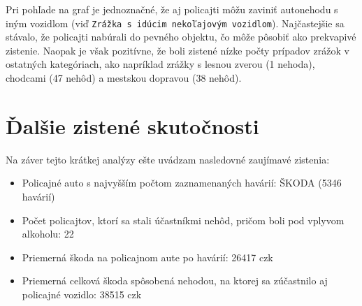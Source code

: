 \documentclass{article}
\begin{document}
Pri pohľade na graf je jednoznačné, že aj policajti môžu zaviniť autonehodu s iným vozidlom
(viď \texttt{Zrážka s idúcim nekoľajovým vozidlom}).
Najčastejšie sa stávalo, že policajti nabúrali do pevného objektu, čo môže pôsobiť ako prekvapivé zistenie.
Naopak je však pozitívne, že boli zistené nízke počty prípadov zrážok v ostatných kategóriach,
ako napríklad zrážky s lesnou zverou (1 nehoda), chodcami (47 nehôd) a mestskou dopravou (38 nehôd).



\section{Ďalšie zistené skutočnosti}\label{sec:dalsie-postrehnute-skutocnosti}

Na záver tejto krátkej analýzy ešte uvádzam nasledovné zaujímavé zistenia:

\begin{itemize}
 \item Policajné auto s najvyšším počtom zaznamenaných havárií: ŠKODA (5346 havárií)
 \item Počet policajtov, ktorí sa stali účastníkmi nehôd, pričom boli pod vplyvom alkoholu: 22
 \item Priemerná škoda na policajnom aute po havárií: 26417 czk
 \item Priemerná celková škoda spôsobená nehodou, na ktorej sa zúčastnilo aj policajné vozidlo: 38515 czk
\end{itemize}
\end{document}

